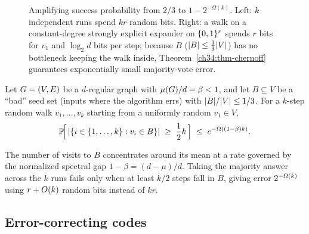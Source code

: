 \begin{figure}[htbp]
\caption{Amplifying success probability from $2/3$ to $1-2^{-\Omega(k)}$. Left: $k$ independent runs spend $kr$ random bits. Right: a walk on a constant-degree strongly explicit expander on $\{0,1\}^r$ spends $r$ bits for $v_1$ and $\log_2 d$ bits per step; because $B$ ($\lvert B\rvert\le\frac{1}{3}\lvert V\rvert$) has no bottleneck keeping the walk inside, Theorem~\ref{ch34:thm-chernoff} guarantees exponentially small majority-vote error.}
\label{ch34:fig-expander-walk}
\end{figure}

\begin{theorem}
\label{ch34:thm-chernoff}
Let $G=(V,E)$ be a $d$-regular graph with $\mu(G)/d = \beta < 1$, and let $B\subseteq V$ be a ``bad'' seed set (inputs where the algorithm errs) with $\lvert B\rvert/\lvert V\rvert\le 1/3$. For a $k$-step random walk $v_1,\dots,v_k$ starting from a uniformly random $v_1\in V$,
\[
  \operatorname{\mathbb{P}}\!\Bigl[\,\lvert\{i\in\{1,\dots,k\} : v_i\in B\}\rvert \;\ge\; \frac{1}{2}k\,\Bigr] \;\le\; e^{-\Omega((1-\beta)k)}.
\]
\end{theorem}

The number of visits to $B$ concentrates around its mean at a rate governed by the normalized spectral gap $1-\beta = (d-\mu)/d$. Taking the majority answer across the $k$ runs fails only when at least $k/2$ steps fall in $B$, giving error $2^{-\Omega(k)}$ using $r+O(k)$ random bits instead of $kr$.

\subsection{Error-correcting codes}
\label{ch34:codes}

